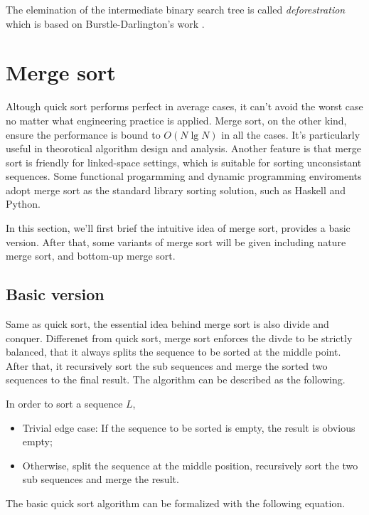 \documentclass{article}
\begin{document}
The elemination of the intermediate binary search tree is called {\em deforestration}
which is based on Burstle-Darlington's work \cite{slpj}.


\section{Merge sort}
Altough quick sort performs perfect in average cases, it can't avoid the worst case no matter what
engineering practice is applied. Merge sort, on the other kind, ensure the performance is bound to
$O(N \lg N)$ in all the cases. It's particularly useful in theorotical algorithm design and analysis.
Another feature is that merge sort is friendly for linked-space settings, which is suitable for
sorting unconsistant sequences. Some functional progarmming and dynamic programming enviroments
adopt merge sort as the standard library sorting solution, such as Haskell and Python.

In this section, we'll first brief the intuitive idea of merge sort, provides a basic version.
After that, some variants of merge sort will be given including nature merge sort, and bottom-up
merge sort.

\subsection{Basic version}
Same as quick sort, the essential idea behind merge sort is also divide and conquer. Differenet
from quick sort, merge sort enforces the divde to be strictly balanced, that it always splits the 
sequence to be sorted at the middle point. After that, it recursively sort the sub sequences
and merge the sorted two sequences to the final result. The algorithm can be described as the
following.

In order to sort a sequence $L$,
\begin{itemize}
\item Trivial edge case: If the sequence to be sorted is empty, the result is obvious empty;
\item Otherwise, split the sequence at the middle position, recursively sort the two sub sequences
and merge the result.
\end{itemize}

The basic quick sort algorithm can be formalized with the following equation.
\end{document}
